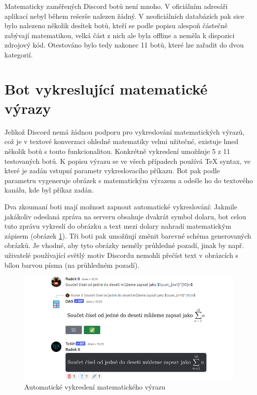 \documentclass[FM]{tulthesis}
\begin{document}
	Matematicky zaměřených Discord botů není mnoho. V oficiálním adresáři aplikací nebyl během rešerše nalezen žádný. V neoficiálních databázích pak sice bylo nalezeno několik desítek botů, kteří se podle popisu alespoň částečně zabývají matematikou, velká část z nich ale byla offline a neměla k dispozici zdrojový kód. Otestováno bylo tedy nakonec 11 botů, které lze zařadit do dvou kategorií.
	
	\section{Bot vykreslující matematické výrazy}

	Jelikož Discord nemá žádnou podporu pro vykreslování matematických výrazů, což je v textové konverzaci ohledně matematiky velmi užitečné, existuje hned několik botů s touto funkcionalitou. Konkrétně vykreslení umožňuje 5 z 11 testovaných botů. K popisu výrazu se ve všech případech používá TeX syntax, ve které je zadán vstupní parametr vykreslovacího příkazu. Bot pak podle parametru vygeneruje obrázek s matematickým výrazem a odešle ho do textového kanálu, kde byl příkaz zadán.
	
	Dva zkoumaní boti mají možnost zapnout automatické vykreslování: Jakmile jakákoliv odeslaná zpráva na serveru obsahuje dvakrát symbol dolaru, bot celou tuto zprávu vykreslí do obrázku a text mezi dolary nahradí matematickým zápisem (obrázek \ref{_tag_img_autotex}). Tři boti pak umožňují změnit barevné schéma generovaných obrázků. Je vhodné, aby tyto obrázky neměly průhledné pozadí, jinak by např. uživatelé používající světlý motiv Discordu nemohli přečíst text v obrázcích s bílou barvou písma (na průhledném pozadí).
	
	\begin{figure}[ht]
		\centering
		\includegraphics[width=\textwidth]{img/AutoTeX}
		\caption{Automatické vykreslení matematického výrazu}
		\label{_tag_img_autotex}
	\end{figure}
	
\end{document}
